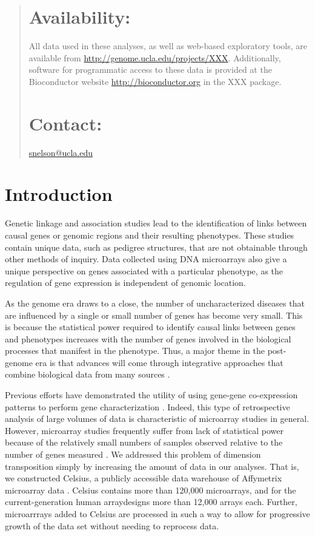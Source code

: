 \documentclass{bioinfo}
\begin{document}
\begin{abstract}
\section{Availability:}
All data used in these analyses, as well as web-based exploratory tools, are
available from \url{http://genome.ucla.edu/projects/XXX}.  Additionally,
software for programmatic access to these data is provided at the Bioconductor
website \url{http://bioconductor.org} in the XXX package.

\section{Contact:} \href{snelson@ucla.edu}{snelson@ucla.edu}
\end{abstract}

\section{Introduction}

Genetic linkage and association studies lead to the identification of links
between causal genes or genomic regions and their resulting phenotypes.  These
studies contain unique data, such as pedigree structures, that are not
obtainable through other methods of inquiry.  Data collected using DNA
microarrays also give a unique perspective on genes associated with a
particular phenotype, as the regulation of gene expression is independent of
genomic location.

As the genome era draws to a close, the number of uncharacterized diseases that
are influenced by a single or small number of genes has become very small.
This is because the statistical power required to identify causal links between
genes and phenotypes increases with the number of genes involved in the
biological processes that manifest in the phenotype.  Thus, a major theme in
the post-genome era is that advances will come through integrative approaches
that combine biological data from many sources \cite{liver,operon,csbdb}.

Previous efforts have demonstrated the utility of using gene-gene co-expression
patterns to perform gene characterization
\cite{webtom,carlson,aspm,wormnet,agca}.  Indeed, this type of retrospective
analysis of large volumes of data is characteristic of microarray studies in
general.  However, microarray studies frequently suffer from lack of
statistical power because of the relatively small numbers of samples observed
relative to the number of genes measured \cite{dimensionality}.  We addressed
this problem of dimension transposition simply by increasing the amount of data
in our analyses.  That is, we constructed Celsius, a publicly accessible data
warehouse of Affymetrix microarray data \cite{celsius}.  Celsius contains more
than 120,000 microarrays, and for the current-generation human arraydesigns
more than 12,000 arrays each.  Further, microarrrays added to Celsius are
processed in such a way to allow for progressive growth of the data set without
needing to reprocess data.
\end{document}
